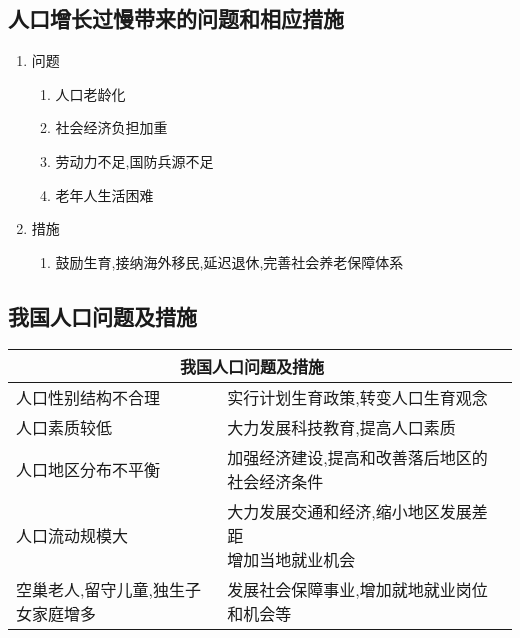 \documentclass[a4paper]{article}
\begin{document}
    \subsection{人口增长过慢带来的问题和相应措施}
    \begin{enumerate}
        \item 问题
        \begin{enumerate}
            \item 人口老龄化
            \item 社会经济负担加重
            \item 劳动力不足,国防兵源不足
            \item 老年人生活困难
        \end{enumerate}
        \item 措施
        \begin{enumerate}
            \item 鼓励生育,接纳海外移民,延迟退休,完善社会养老保障体系
        \end{enumerate}
    \end{enumerate}
    \subsection{我国人口问题及措施}%
    \begin{table}[h]%
        \begin{tabular}{|p{35mm}|l|l|}
            \hline
            \multicolumn{2}{c}{我国人口问题及措施} \\
            \hline
            人口性别结构不合理 & 实行计划生育政策,转变人口生育观念 \\
            \hline
            人口素质较低 & 大力发展科技教育,提高人口素质 \\
            \hline
            人口地区分布不平衡 & 加强经济建设,提高和改善落后地区的社会经济条件 \\
            \hline
            人口流动规模大 & \makecell[l]{大力发展交通和经济,缩小地区发展差距 \\ 增加当地就业机会} \\
            \hline
            空巢老人,留守儿童,独生子女家庭增多 & 发展社会保障事业,增加就地就业岗位和机会等 \\
            \hline
        \end{tabular}
    \end{table}
\end{document}
